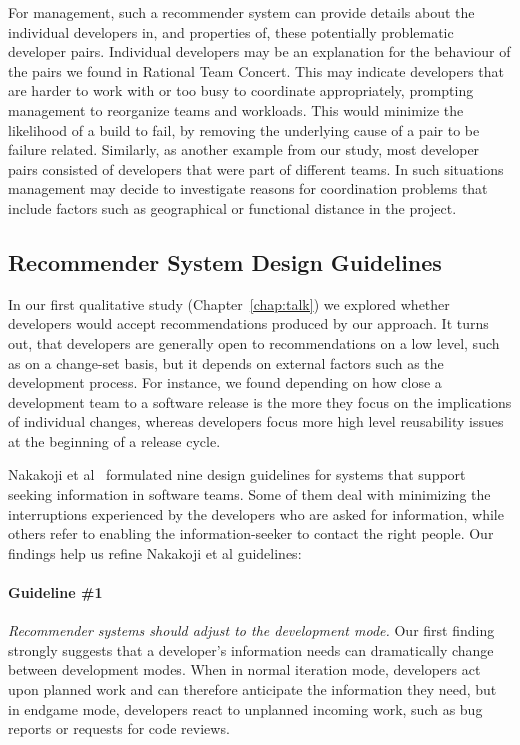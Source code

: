 For management, such a recommender system can provide details about the
individual developers in, and properties of, these potentially problematic
developer pairs. Individual developers may be an explanation for the behaviour of
the pairs we found in Rational Team Concert. This may indicate developers that are
harder to work with or too busy to coordinate appropriately, prompting management
to reorganize teams and workloads. This would minimize the likelihood of a build
to fail, by removing the underlying cause of a pair to be failure related.
Similarly, as another example from our study, most developer pairs
consisted of developers that were part of different teams. In such
situations management may decide to investigate reasons for coordination
problems that include factors such as geographical or functional distance in the project.

\subsection{Recommender System Design Guidelines}
\label{sec:sub:tools}
In our first qualitative study (Chapter~\ref{chap:talk}) we explored whether developers would accept recommendations produced by our approach.
It turns out, that developers are generally open to recommendations on a low level, such as on a change-set basis, but it depends on external factors such as the development process.
For instance, we found depending on how close a development team to a software release is the more they focus on the implications of individual changes, whereas developers focus more high level reusability issues at the beginning of a release cycle.

Nakakoji et al~\cite{nakakoji2010:rdc} formulated nine design guidelines for systems that support seeking information in software teams. Some of them deal with minimizing the interruptions experienced by the developers who are asked for information, while others refer to enabling the information-seeker to contact the right people. Our findings help us refine Nakakoji et al guidelines:

\paragraph{Guideline \#1} \emph{Recommender systems should adjust to the development mode.}
Our first finding strongly suggests that a developer's information needs can dramatically change between development modes. 
%
When in normal iteration mode, developers act upon planned work and can therefore anticipate the information they need, but in endgame mode, developers react to unplanned incoming work, such as bug reports or requests for code reviews. 

